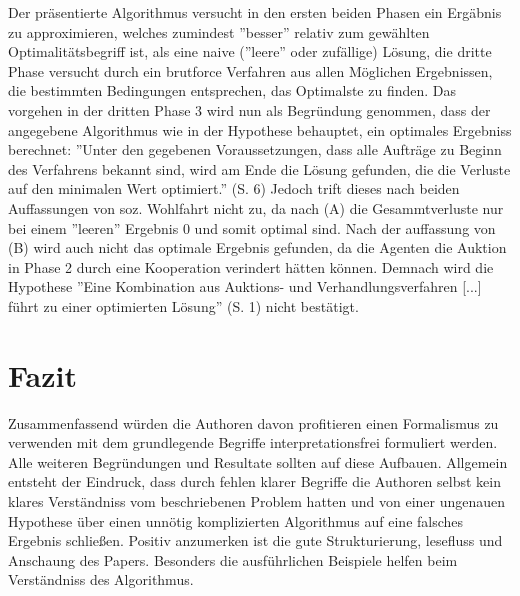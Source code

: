 \documentclass[sigconf]{acmart}
\theoremstyle{break}
\begin{document}
Der präsentierte Algorithmus versucht in den ersten beiden Phasen ein Ergäbnis zu approximieren, welches zumindest ''besser'' relativ zum gewählten Optimalitätsbegriff ist, als eine naive (''leere'' oder zufällige) Lösung, die dritte Phase versucht durch ein brutforce Verfahren aus allen Möglichen Ergebnissen, die bestimmten Bedingungen entsprechen, das Optimalste zu finden.
Das vorgehen in der dritten Phase 3 wird nun als Begründung genommen, dass der angegebene Algorithmus wie in der Hypothese behauptet, ein optimales Ergebniss berechnet:
''Unter den gegebenen Voraussetzungen, dass alle Aufträge zu Beginn des Verfahrens bekannt sind, wird am Ende die Lösung gefunden, die die Verluste auf den minimalen Wert optimiert.'' (S. 6)
Jedoch trift dieses nach beiden Auffassungen von soz. Wohlfahrt nicht zu, da nach (A) die Gesammtverluste nur bei einem ''leeren'' Ergebnis 0 und somit optimal sind. Nach der auffassung von (B) wird auch nicht das optimale Ergebnis gefunden, da die Agenten die Auktion in Phase 2 durch eine Kooperation verindert hätten können. Demnach wird die Hypothese ''Eine Kombination aus Auktions- und Verhandlungsverfahren [...] führt zu einer optimierten Lösung'' (S. 1) nicht bestätigt.


\section{Fazit}
\label{sec:fazit}
Zusammenfassend würden die Authoren davon profitieren einen Formalismus zu verwenden mit dem grundlegende Begriffe interpretationsfrei formuliert werden. Alle weiteren Begründungen und Resultate sollten auf diese Aufbauen. Allgemein entsteht der Eindruck, dass durch fehlen klarer Begriffe die Authoren selbst kein klares Verständniss vom beschriebenen Problem hatten und von einer ungenauen Hypothese über einen unnötig komplizierten Algorithmus auf eine falsches Ergebnis schließen.
Positiv anzumerken ist die gute Strukturierung, lesefluss und Anschaung des Papers. Besonders die ausführlichen Beispiele helfen beim Verständniss des Algorithmus.
\end{document}
